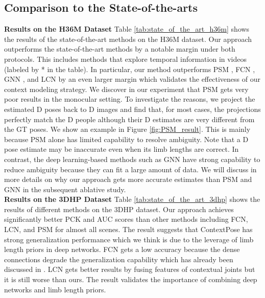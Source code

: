 \subsection{Comparison to the State-of-the-arts}
\noindent\textbf{Results on the H36M Dataset} Table \ref{tab:state_of_the_art_h36m} shows the results of the state-of-the-art methods on the H36M dataset. Our approach outperforms the state-of-the-art methods by a notable margin under both protocols. This includes methods that explore temporal information in videos (labeled by * in the table). In particular, our method outperforms PSM \cite{qiu2019cross}, FCN \cite{martinez2017simple}, GNN \cite{zhao2019semantic}, and LCN \cite{Ci_2019_ICCV} by an even larger margin which validates the effectiveness of our context modeling strategy. We discover in our experiment that PSM \cite{qiu2019cross} gets very poor results in the monocular setting. To investigate the reasons, we project the estimated D poses back to D images and find that, for most cases, the projections perfectly match the D people although their D estimates are very different from the GT poses. We show an example in Figure \ref{fig:PSM_result}. This is mainly because PSM alone has limited capability to resolve  ambiguity. Note that a D pose estimate may be inaccurate even when its limb lengths are correct. In contrast, the deep learning-based methods such as GNN \cite{martinez2017simple,zhao2019semantic,Ci_2019_ICCV} have strong capability to reduce ambiguity because they can fit a large amount of data. We will discuss in more details on why our approach gets more accurate estimates than PSM and GNN in the subsequent ablative study.\\



\noindent\textbf{Results on the 3DHP Dataset}
Table \ref{tab:state_of_the_art_3dhp} shows the results of different methods on the 3DHP dataset. Our approach achieves significantly better PCK and AUC scores than other methods including FCN, LCN, and PSM for almost all scenes. The result suggests that ContextPose has strong generalization performance which we think is due to the leverage of limb length priors in deep networks. FCN \cite{martinez2017simple} gets a low accuracy because the dense connections degrade the generalization capability which has already been discussed in \cite{Ci_2019_ICCV}. LCN \cite{Ci_2019_ICCV} gets better results by fusing features of contextual joints but it is still worse than ours. The result validates the importance of combining deep networks and limb length priors.

